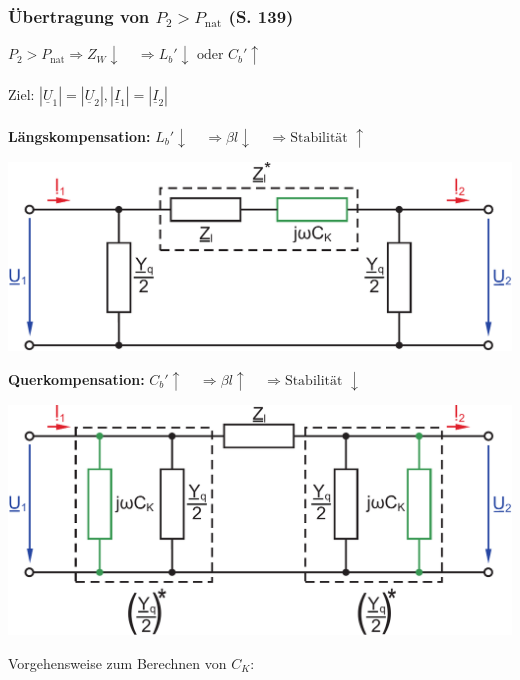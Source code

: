 \documentclass[a4paper,twocolumn,10pt]{article}
\begin{document}
\subsubsection{Übertragung von $P_2>P_{\text{nat}}$ (S. 139)}
$P_2>P_{\text{nat}}\Rightarrow Z_W\downarrow\;\;\;\;\Rightarrow L_b'\downarrow\text{ oder }C_b'\uparrow$\\\\
Ziel: $|\underline{U}_1|=|\underline{U}_2|,|\underline{I}_1|=|\underline{I}_2|$\\\\
\textbf{Längskompensation:} $L_b'\downarrow\;\;\;\;\Rightarrow\beta l\downarrow\;\;\;\;\Rightarrow\text{Stabilität }\uparrow$
\begin{center}
\includegraphics[width=0.98\columnwidth]{Grafiken/Laengskompensation_2}
\end{center}
\vspace{0.3cm}
\textbf{Querkompensation:} $C_b'\uparrow\;\;\;\;\Rightarrow\beta l\uparrow\;\;\;\;\Rightarrow\text{Stabilität }\downarrow$
\begin{center}
\includegraphics[width=0.98\columnwidth]{Grafiken/Querkompensation_2}
\end{center}
Vorgehensweise zum Berechnen von $C_K$:
\end{document}
